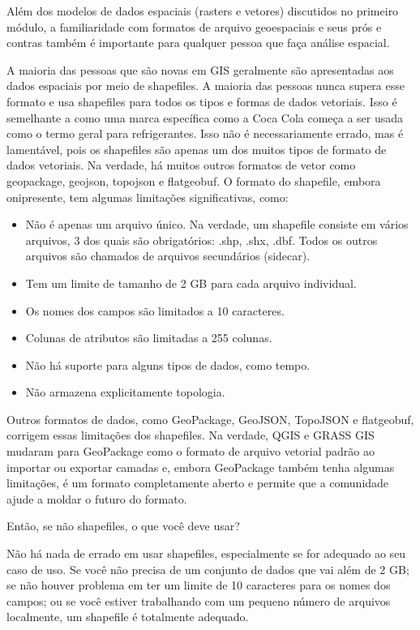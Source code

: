 \documentclass[
]{book}
\providecommand{\tightlist}{%
  \setlength{\itemsep}{0pt}\setlength{\parskip}{0pt}}
\begin{document}
Além dos modelos de dados espaciais (rasters e vetores) discutidos no primeiro módulo, a familiaridade com formatos de arquivo geoespaciais e seus prós e contras também é importante para qualquer pessoa que faça análise espacial.

A maioria das pessoas que são novas em GIS geralmente são apresentadas aos dados espaciais por meio de shapefiles. A maioria das pessoas nunca supera esse formato e usa shapefiles para todos os tipos e formas de dados vetoriais. Isso é semelhante a como uma marca específica como a Coca Cola começa a ser usada como o termo geral para refrigerantes. Isso não é necessariamente errado, mas é lamentável, pois os shapefiles são apenas um dos muitos tipos de formato de dados vetoriais. Na verdade, há muitos outros formatos de vetor como geopackage, geojson, topojson e flatgeobuf. O formato do shapefile, embora onipresente, tem algumas limitações significativas, como:

\begin{itemize}
\tightlist
\item
  Não é apenas um arquivo único. Na verdade, um shapefile consiste em vários arquivos, 3 dos quais são obrigatórios: .shp, .shx, .dbf. Todos os outros arquivos são chamados de arquivos secundários (sidecar).
\item
  Tem um limite de tamanho de 2 GB para cada arquivo individual.
\item
  Os nomes dos campos são limitados a 10 caracteres.
\item
  Colunas de atributos são limitadas a 255 colunas.
\item
  Não há suporte para alguns tipos de dados, como tempo.
\item
  Não armazena explicitamente topologia.
\end{itemize}

Outros formatos de dados, como GeoPackage, GeoJSON, TopoJSON e flatgeobuf, corrigem essas limitações dos shapefiles. Na verdade, QGIS e GRASS GIS mudaram para GeoPackage como o formato de arquivo vetorial padrão ao importar ou exportar camadas e, embora GeoPackage também tenha algumas limitações, é um formato completamente aberto e permite que a comunidade ajude a moldar o futuro do formato.

Então, se não shapefiles, o que você deve usar?

Não há nada de errado em usar shapefiles, especialmente se for adequado ao seu caso de uso. Se você não precisa de um conjunto de dados que vai além de 2 GB; se não houver problema em ter um limite de 10 caracteres para os nomes dos campos; ou se você estiver trabalhando com um pequeno número de arquivos localmente, um shapefile é totalmente adequado.
\end{document}
